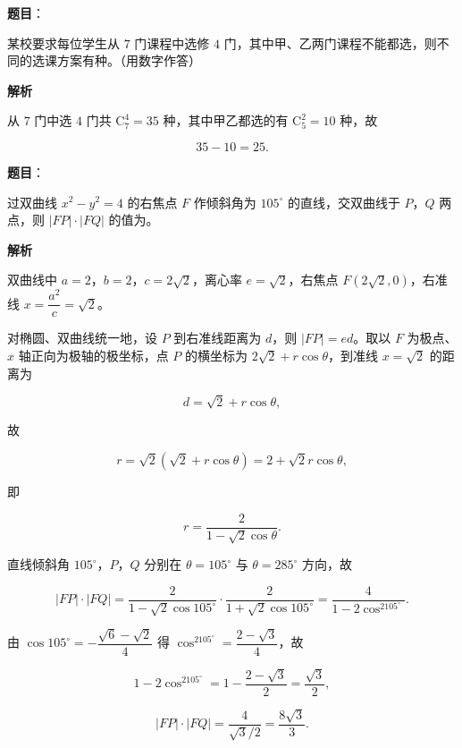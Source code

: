\begin{answer}

\textbf{题目}：

某校要求每位学生从 $7$ 门课程中选修 $4$ 门，其中甲、乙两门课程不能都选，则不同的选课方案有\gkblank{}种。（用数字作答）

\textbf{解析}

从 $7$ 门中选 $4$ 门共 $\mathrm C_7^4=35$ 种，其中甲乙都选的有 $\mathrm C_5^2=10$ 种，故

\nopagebreak[4]
\[35-10=25.\]


\end{answer}
\begin{answer}

\textbf{题目}：

过双曲线 $x^2-y^2=4$ 的右焦点 $F$ 作倾斜角为 $105^\circ$ 的直线，交双曲线于 $P$，$Q$ 两点，则 $|FP|\cdot|FQ|$ 的值为\gkblank{}。

\textbf{解析}

双曲线中 $a=2$，$b=2$，$c=2\sqrt2$，离心率 $e=\sqrt2$，右焦点 $F(2\sqrt2,0)$，右准线 $x=\dfrac{a^2}c=\sqrt2$。

对椭圆、双曲线统一地，设 $P$ 到右准线距离为 $d$，则 $|FP|=ed$。取以 $F$ 为极点、$x$ 轴正向为极轴的极坐标，点 $P$ 的横坐标为 $2\sqrt2+r\cos\theta$，到准线 $x=\sqrt2$ 的距离为

\nopagebreak[4]
\[d=\sqrt2+r\cos\theta,\]

故

\nopagebreak[4]
\[r=\sqrt2\left(\sqrt2+r\cos\theta\right)=2+\sqrt2 r\cos\theta,\]

即

\nopagebreak[4]
\[r=\frac2{1-\sqrt2\cos\theta}.\]

直线倾斜角 $105^\circ$，$P$，$Q$ 分别在 $\theta=105^\circ$ 与 $\theta=285^\circ$ 方向，故

\nopagebreak[4]
\[|FP|\cdot|FQ|=\frac2{1-\sqrt2\cos105^\circ}\cdot\frac2{1+\sqrt2\cos105^\circ}=\frac{4}{1-2\cos^2105^\circ}.\]

由 $\cos105^\circ=-\dfrac{\sqrt6-\sqrt2}4$ 得 $\cos^2105^\circ=\dfrac{2-\sqrt3}4$，故

\nopagebreak[4]
\[1-2\cos^2105^\circ=1-\frac{2-\sqrt3}2=\frac{\sqrt3}2,\]

\nopagebreak[4]
\[|FP|\cdot|FQ|=\frac4{\sqrt3/2}=\frac{8\sqrt3}3.\]


\end{answer}
